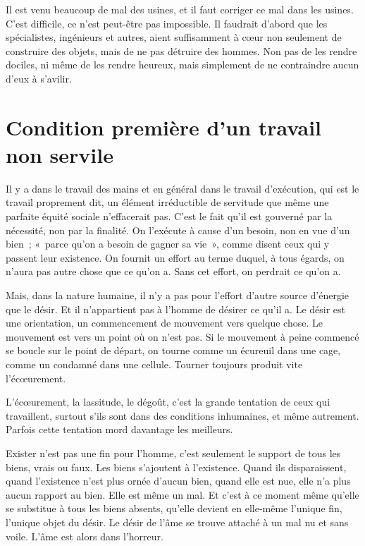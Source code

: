 \documentclass[french,twoside]{book} %
\begin{document}
Il est venu beaucoup de mal des usines, et il faut corriger ce mal dans les usines. C'est difficile, ce n'est peut-être pas impossible. Il faudrait d'abord que les spécialistes, ingénieurs et autres, aient suffisamment à cœur non seulement de construire des objets, mais de ne pas détruire des hommes. Non pas de les rendre dociles, ni même de les rendre heureux, mais simplement de ne contraindre aucun d'eux à s'avilir.
\section[Condition première d'un travail non servile ]{Condition première d'un travail non servile \protect\footnotemark }\renewcommand{\leftmark}{Condition première d'un travail non servile }

\noindent \par
Il y a dans le travail des mains et en général dans le travail d'exécution, qui est le travail proprement dit, un élément irréductible de servitude que même une parfaite équité sociale n'effacerait pas. C'est le fait qu'il est gouverné par la nécessité, non par la finalité. On l'exécute à cause d'un besoin, non en vue d'un bien ; « parce qu'on a besoin de gagner sa vie », comme disent ceux qui y passent leur existence. On fournit un effort au terme duquel, à tous égards, on n'aura pas autre chose que ce qu'on a. Sans cet effort, on perdrait ce qu'on a.\par
Mais, dans la nature humaine, il n'y a pas pour l'effort d'autre source d'énergie que le désir. Et il n'appartient pas à l'homme de désirer ce qu'il a. Le désir est une orientation, un commencement de mouvement vers quelque chose. Le mouvement est vers un point où on n'est pas. Si le mouvement à peine commencé se boucle sur le point de départ, on tourne comme un écureuil dans une cage, comme un condamné dans une cellule. Tourner toujours produit vite l'écœurement.\par
L'écœurement, la lassitude, le dégoût, c'est la grande tentation de ceux qui travaillent, surtout s'ils sont dans des conditions inhumaines, et même autrement. Parfois cette tentation mord davantage les meilleurs.\par
Exister n'est pas une fin pour l'homme, c'est seulement le support de tous les biens, vrais ou faux. Les biens s'ajoutent à l'existence. Quand ils disparaissent, quand l'existence n'est plus ornée d'aucun bien, quand elle est nue, elle n'a plus aucun rapport au bien. Elle est même un mal. Et c'est à ce moment même qu'elle se substitue à tous les biens absents, qu'elle devient en elle-même l'unique fin, l'unique objet du désir. Le désir de l'âme se trouve attaché à un mal nu et sans voile. L'âme est alors dans l'horreur.\par
\end{document}
